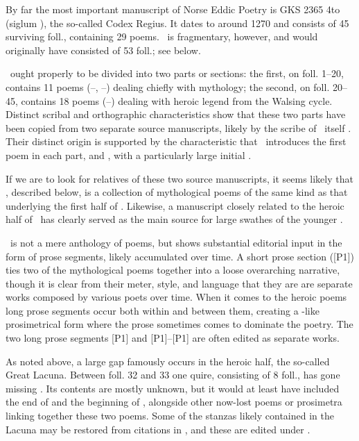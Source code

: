 By far the most important manuscript of Norse Eddic Poetry is GKS 2365 4to (siglum \Regius), the so-called Codex Regius.  It dates to around 1270 and consists of 45 surviving foll., containing 29 poems.  \Regius\ is fragmentary, however, and would originally have consisted of 53 foll.; see below.

\Regius\ ought properly to be divided into two parts or sections: the first, on foll. 1--20, contains 11 poems (--,  --) dealing chiefly with mythology; the second, on foll. 20--45, contains 18 poems (--) dealing with heroic legend from the Walsing cycle.
Distinct scribal and orthographic characteristics show that these two parts have been copied from two separate source manuscripts, likely by the scribe of \Regius\ itself \parencite[esp.~pp.~160--163]{Lindblad1980}.  Their distinct origin is supported by the characteristic that \Regius\ introduces the first poem in each part,  and , with a particularly large initial \parencite[166]{Lindblad1980}.

If we are to look for relatives of these two source manuscripts, it seems likely that \AM, described below, is a collection of mythological poems of the same kind as that underlying the first half of \Regius.  Likewise, a manuscript closely related to the heroic half of \Regius\ has clearly served as the main source for large swathes of the younger \VolsungaSaga.

\Regius\ is not a mere anthology of poems, but shows substantial editorial input in the form of prose segments, likely accumulated over time.  A short prose section ([P1]) ties two of the mythological poems together into a loose overarching narrative, though it is clear from their meter, style, and language that they are are separate works composed by various poets over time.  When it comes to the heroic poems long prose segments occur both within and between them, creating a -like prosimetrical form where the prose sometimes comes to dominate the poetry.  The two long prose segments [P1] and [P1]--[P1] are often edited as separate works.

As noted above, a large gap famously occurs in the heroic half, the so-called Great Lacuna.  Between foll. 32 and 33 one quire, consisting of 8 foll., has gone missing \parencite[6 n. 2]{Lindblad1977}.  Its contents are mostly unknown, but it would at least have included the end of  and the beginning of , alongside other now-lost poems or prosimetra linking together these two poems.  Some of the stanzas likely contained in the Lacuna may be restored from citations in \VolsungaSaga, and these are edited under .

